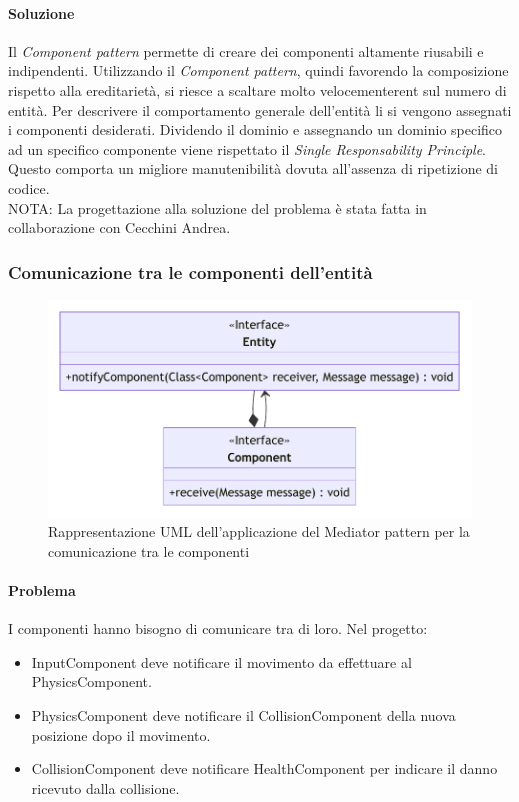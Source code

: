 \documentclass[a4paper,12pt]{report}
\begin{document}
\paragraph{Soluzione} Il \textit{Component pattern} permette di creare dei componenti altamente riusabili e indipendenti.
Utilizzando il \textit{Component pattern}, quindi favorendo la composizione rispetto alla ereditarietà, si riesce a scaltare
molto velocementerent sul numero di entità.
Per descrivere il comportamento generale dell'entità li si vengono assegnati i componenti desiderati.
Dividendo il dominio e assegnando un dominio specifico ad un specifico componente viene rispettato il \textit{Single Responsability Principle}.
Questo comporta un migliore manutenibilità dovuta all'assenza di ripetizione di codice.\\
NOTA: La progettazione alla soluzione del problema è stata fatta in collaborazione con Cecchini Andrea.

\subsubsection{Comunicazione tra le componenti dell'entità}

\begin{figure}[H]
\centering{}
\includegraphics[width=\textwidth]{img/ComponentCommunicationUML}
\caption{Rappresentazione UML dell'applicazione del Mediator pattern per la comunicazione tra le componenti}
\end{figure}

\paragraph{Problema} I componenti hanno bisogno di comunicare tra di loro. Nel progetto:
\begin{itemize}
	\item InputComponent deve notificare il movimento da effettuare al PhysicsComponent.
	\item PhysicsComponent deve notificare il CollisionComponent della nuova posizione dopo il movimento.
	\item CollisionComponent deve notificare HealthComponent per indicare il danno ricevuto dalla collisione.
\end{itemize}
\end{document}
